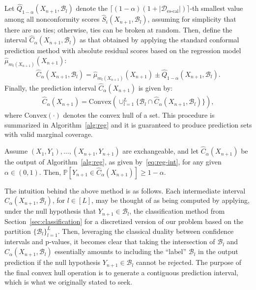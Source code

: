 Let $\hat{Q}_{1-\alpha}(X_{n+1},\mathcal{B}_l)$ denote the $\lceil (1-\alpha)(1+|\mathcal{D}_{\text{es-cal}}|) \rceil$-th smallest value among all nonconformity scores $\hat{S}_i(X_{n+1},\mathcal{B}_l)$, assuming for simplicity that there are no ties; otherwise, ties can be broken at random.
Then, define the interval $\hat{C}_{\alpha}(X_{n+1}, \mathcal{B}_l)$ as that obtained by applying the standard conformal prediction method with absolute residual scores based on the regression model $\hat{\mu}_{m_l(X_{n+1})}(X_{n+1})$:
\begin{align} \label{eq:reg-int-tmp}
  \hat{C}_{\alpha}(X_{n+1}, \mathcal{B}_l) = \hat{\mu}_{m_l(X_{n+1})}(X_{n+1}) \pm \hat{Q}_{1-\alpha}(X_{n+1},\mathcal{B}_l).
\end{align}
Finally, the prediction interval $\hat{C}_{\alpha}(X_{n+1})$ is given by:
\begin{align} \label{eq:reg-int}
  \hat{C}_{\alpha}(X_{n+1}) = \text{Convex}\left( \cup_{l=1}^{L} \{ \mathcal{B}_l \cap \hat{C}_{\alpha}(X_{n+1}, \mathcal{B}_l) \} \right),
\end{align}
where $\text{Convex}(\cdot)$ denotes the convex hull of a set.
This procedure is summarized in Algorithm~\ref{alg:reg} and it is guaranteed to produce prediction sets with valid marginal coverage.


\begin{theorem}\label{thm:reg}
Assume $(X_{1},Y_{1}), \ldots, (X_{n+1},Y_{n+1})$ are exchangeable, and let $\hat{C}_{\alpha}(X_{n+1})$ be the output of Algorithm~\ref{alg:reg}, as given by~\eqref{eq:reg-int}, for any given $\alpha \in (0,1)$.
Then, $\mathbb{P}[Y_{n+1} \in \hat{C}_{\alpha}(X_{n+1})] \geq 1-\alpha$.
\end{theorem}

The intuition behind the above method is as follows.
Each intermediate interval $\hat{C}_{\alpha}(X_{n+1}, \mathcal{B}_l)$, for $l \in [L]$, may be thought of as being computed by applying, under the null hypothesis that $Y_{n+1} \in \mathcal{B}_l$, the classification method from Section~\ref{sec:classification} for a discretized version of our problem based on the partition $\{\mathcal{B}_l\}_{l=1}^{L}$. Then, leveraging the classical duality between confidence intervals and p-values, it becomes clear that taking the intersection of $\mathcal{B}_l$ and $\hat{C}_{\alpha}(X_{n+1}, \mathcal{B}_l)$ essentially amounts to including the ``label'' $\mathcal{B}_l$ in the output prediction if the null hypothesis $Y_{n+1} \in \mathcal{B}_l$ cannot be rejected.
The purpose of the final convex hull operation is to generate a contiguous prediction interval, which is what we originally stated to seek.

